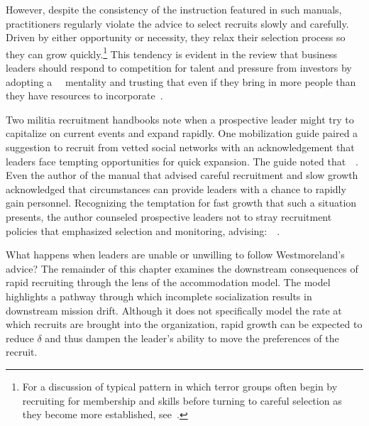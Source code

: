 However, despite the consistency of the instruction featured in such manuals, practitioners regularly violate the advice to select recruits slowly and carefully. Driven by either opportunity or necessity, they relax their selection process so they can grow quickly.\footnote{For a discussion of typical pattern in which terror groups often begin by recruiting for membership and skills before turning to careful selection as they become more established, see~\cite{bloom2017constructing}.} This tendency is evident in the review that business leaders should respond to competition for talent and pressure from investors by adopting a~~\autocite{davis2019strategies} mentality and trusting that even if they bring in more people than they have resources to incorporate~\autocite{suster2011hire}.

Two militia recruitment handbooks note when a prospective leader might try to capitalize on current events and expand rapidly. One mobilization guide paired a suggestion to recruit from vetted social networks with an acknowledgement that leaders face tempting opportunities for quick expansion. The guide noted that~~\autocite{shayler2019how}. Even the author of the manual that advised careful recruitment and slow growth acknowledged that circumstances can provide leaders with a chance to rapidly gain personnel. Recognizing the temptation for fast growth that such a situation presents, the author counseled prospective leaders not to stray recruitment policies that emphasized selection and monitoring, advising:~~\autocite[5]{westmoreland1994start}.

What happens when leaders are unable or unwilling to follow Westmoreland's advice?  The remainder of this chapter examines the downstream consequences of rapid recruiting through the lens of the accommodation model. The model highlights a pathway through which incomplete socialization results in downstream mission drift. Although it does not specifically model the rate at which recruits are brought into the organization, rapid growth can be expected to reduce $\delta$ and thus dampen the leader's ability to move the preferences of the recruit.

